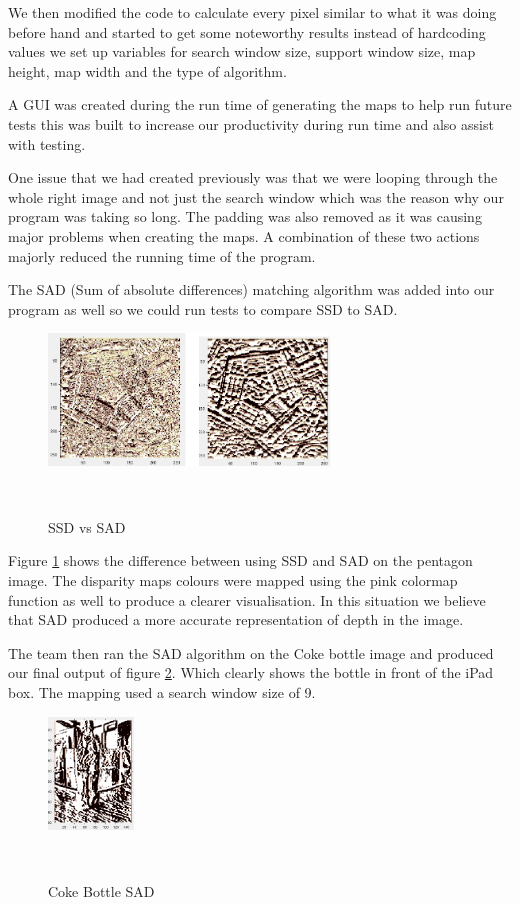 \documentclass[twocolumn]{article}
\begin{document}
We then modified the code to calculate every pixel similar to what it was doing before hand and started to get some noteworthy results instead of hardcoding values we set up variables for search window size, support window size, map height, map width and the type of algorithm.

A GUI was created during the run time of generating the maps to help run future tests this was built to increase our productivity during run time and also assist with testing. 

One issue that we had created previously was that we were looping through the whole right image and not just the search window which was the reason why our program was taking so long. The padding was also removed as it was causing major problems when creating the maps. A combination of these two actions majorly reduced the running time of the program.    

The SAD (Sum of absolute differences) matching algorithm was added into our program as well so we could run tests to compare SSD to SAD. 

 \begin{figure}[H]
\centering
  \includegraphics[height=35mm]{Figures/SSDvsSAD}
    \caption{SSD vs SAD}~\label{fig:SSDvsSAD}
\end{figure} 

Figure \ref{fig:SSDvsSAD} shows the difference between using SSD and SAD on the pentagon image. The disparity maps colours were mapped using the pink colormap function as well to produce a clearer visualisation. In this situation we believe that SAD produced a more accurate representation of depth in the image. 

The team then ran the SAD algorithm on the Coke bottle image and produced our final output of figure \ref{fig:Coke_Bottle}. Which clearly shows the bottle in front of the iPad box. The mapping used a search window size of 9.

 \begin{figure}[H]
\centering
  \includegraphics[height=30mm]{Figures/Coke_Bottle}
    \caption{Coke Bottle SAD}~\label{fig:Coke_Bottle}
\end{figure} 
\end{document}
